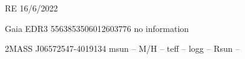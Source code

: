 RE 16/6/2022 

Gaia EDR3 5563853506012603776
no information 

2MASS J06572547-4019134 
msun
-- 
M/H
--
teff
--
logg 
--
Rsun
--
